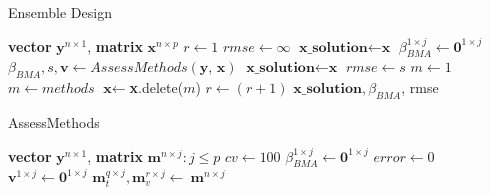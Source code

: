 \documentclass[journal=jpcbfk, manuscript=article]{achemso}
\newcommand{\+}[1]{\ensuremath{\mathbf{#1}}}
\begin{document}
\begin{table}[t] 
	\begin{minipage}[t]{0.45\linewidth}\centering 
		\begin{algorithm}[H] 
			\footnotesize 
			\caption{\newline Ensemble Design} \label{Method:Alg1} 
			\begin{algorithmic}[1] 
				{\scriptsize 
				\REQUIRE \textbf{vector} $\textbf{y}^{n \times 1}$, \textbf{matrix} $\textbf{x}^{n \times p}$\; 
				\vspace{2.5mm} 
				\STATE $r \leftarrow 1$\; 
				\STATE $rmse \leftarrow \infty$\; 
				\STATE $\textbf{x\_solution} \leftarrow \textbf{x}$\; 
				\STATE $\beta_{BMA}^{1 \times j} \leftarrow \textbf{0}^{1 \times j}$\; 
				\; 
					\STATE $\beta_{BMA}, s, \textbf{v} \leftarrow Assess Methods(\textbf{y, x})$\; 
					\; 
						\STATE $\textbf{x\_solution} \leftarrow \textbf{x}$\; 
						\STATE $rmse \leftarrow s$\; 
					\ENDIF\; 
					\STATE $m \leftarrow 1$\; 
					\; 
						\; 
							\STATE $m \leftarrow methods$\;
						\ENDIF\;
					\ENDFOR\;
					\STATE $\textbf{x} \leftarrow $\textbf{x}.delete($m$)
					\;
					\STATE $r\leftarrow (r + 1)$\;
				\ENDWHILE\;
				\RETURN $\textbf{x\_solution},\beta_{BMA}$, rmse\;} 
			\end{algorithmic}
		\end{algorithm}
	\end{minipage}
	\hspace{0.5cm}
	\begin{minipage}[t]{0.45\linewidth}
		\centering
		\begin{algorithm}[H] 
			\footnotesize 
			\caption{\newline AssessMethods} \label{Method:Alg2} 
			\begin{algorithmic}[1] 
				{\scriptsize 
				\REQUIRE  \textbf{vector} $\textbf{y}^{n \times 1}$, \textbf{matrix} $\textbf{m}^{n \times j}: j \leq p$\; 
				\vspace{2.5mm} 
				\STATE $cv \leftarrow 100$\; \; 
				\STATE $\beta_{BMA}^{1 \times j} \leftarrow \textbf{0}^{1 \times j}$\; 
				\STATE $error \leftarrow 0$\; 
				\STATE $\textbf{v}^{1 \times j} \leftarrow \textbf{0}^{1 \times j}$\; 
				\; 
					\STATE $\textbf{m}_{t}^{q \times j}, \textbf{m}_{v}^{r \times j} \leftarrow\ \textbf{m}^{n \times j}$\;
}
\end{algorithmic}
\end{algorithm}
\end{minipage}
\end{table}
\end{document}
